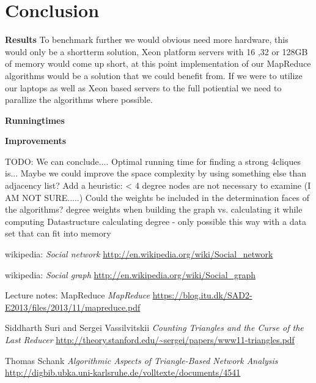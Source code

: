 \documentclass{article}
\begin{document}
\section{Conclusion}

\textbf{Results} \newline
To benchmark further we would obvious need more hardware, this would only be a shortterm solution, Xeon platform servers with 16 ,32 or 128GB of memory would come up short, at this point implementation of our MapReduce algorithms would be a solution that we could benefit from. If we were to utilize our laptops as well as Xeon based servers to the full potiential we need to parallize the algorithms where possible.\newline

\noindent \textbf{Runningtimes} \newline

\noindent \textbf{Improvements} \newline

\noindent TODO: We can conclude....
Optimal running time for finding a strong 4cliques is...
Maybe we could improve the space complexity by using something else than adjacency list?
Add a heuristic: < 4 degree nodes are not necessary to examine (I AM NOT SURE.....)
Could the weights be included in the determination faces of the algorithms?
degree weights when building the graph vs. calculating it while computing
Datastructure calculating degree - only possible this way with a data set that can fit into memory

\begin{thebibliography}{1}

    wikipedia:
    \emph{Social network}
    \url{http://en.wikipedia.org/wiki/Social_network}

    wikipedia:
    \emph{Social graph}
    \url{http://en.wikipedia.org/wiki/Social_graph}

    Lecture notes: MapReduce
    \emph{MapReduce}
    \url{https://blog.itu.dk/SAD2-E2013/files/2013/11/mapreduce.pdf}

    Siddharth Suri and Sergei Vassilvitskii
    \emph{Counting Triangles and the Curse of the Last Reducer}
    \url{http://theory.stanford.edu/~sergei/papers/www11-triangles.pdf}

    Thomas Schank
    \emph{Algorithmic Aspects of Triangle-Based Network Analysis}
    \url{http://digbib.ubka.uni-karlsruhe.de/volltexte/documents/4541}
    
\end{thebibliography}
\end{document}
